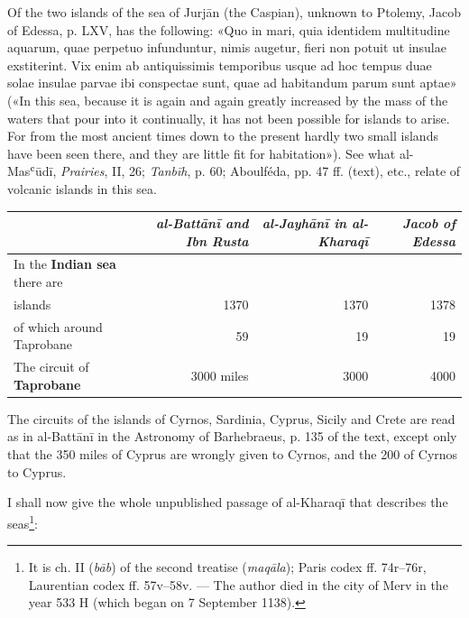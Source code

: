 \documentclass[11pt]{article}
\begin{document}
\par Of the two islands of the sea of Jurjān (the Caspian), unknown to Ptolemy, Jacob of Edessa, p. LXV, has the following: «Quo in mari, quia identidem multitudine aquarum, quae perpetuo infunduntur, nimis augetur, fieri non potuit ut insulae exstiterint. Vix enim ab antiquissimis temporibus usque ad hoc tempus duae solae insulae parvae ibi conspectae sunt, quae ad habitandum parum sunt aptae» («In this sea, because it is again and again greatly increased by the mass of the waters that pour into it continually, it has not been possible for islands to arise. For from the most ancient times down to the present hardly two small islands have been seen there, and they are little fit for habitation»). See what al-Masʿūdī, \emph{Prairies}, II, 26; \emph{Tanbīh}, p. 60; Aboulféda, pp. 47 ff. (text), etc., relate of volcanic islands in this sea.\par
\begin{center}\small\begin{tabular}{lrrr}
 & \emph{al-Battānī and Ibn Rusta} & \emph{al-Jayhānī in al-Kharaqī} & \emph{Jacob of Edessa} \\
\midrule
In the \textbf{Indian sea} there are &  &  &  \\
islands\footnotemark{} & 1370 & 1370 & 1378 \\
of which around Taprobane & 59\footnotemark{}\footnotemarkT{} & 19 & 19 \\
The circuit of \textbf{Taprobane} & 3000 miles & 3000 & 4000 \\
\end{tabular}\end{center}
\addtocounter{footnote}{-2}
\addtocounter{footnoteT}{-1}
\par The circuits of the islands of Cyrnos, Sardinia, Cyprus, Sicily and Crete are read as in al-Battānī in the Astronomy of Barhebraeus, p. 135 of the text, except only that the 350 miles of Cyprus are wrongly given to Cyrnos, and the 200 of Cyrnos to Cyprus.\par
\par I shall now give the whole unpublished passage of al-Kharaqī that describes the seas\footnote{It is ch. II (\emph{bāb}) of the second treatise (\emph{maqāla}); Paris codex ff. 74r–76r, Laurentian codex ff. 57v–58v. — The author died in the city of Merv in the year 533 H (which began on 7 September 1138).}:\par
\end{document}
